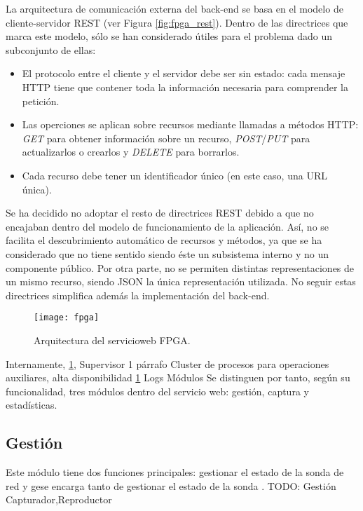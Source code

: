 La arquitectura de comunicación externa del \gls{back-end} se basa en el modelo de cliente-servidor \gls{REST} (ver Figura \ref{fig:fpga_rest}). Dentro de las directrices que marca este modelo, sólo se han considerado útiles para el problema dado un subconjunto de ellas:
\begin{itemize}
  \item El protocolo entre el cliente y el servidor debe ser sin estado: cada mensaje \gls{HTTP} tiene que contener toda la información necesaria para comprender la petición.
  \item Las operciones se aplican sobre recursos mediante llamadas a métodos \gls{HTTP}: \textit{GET} para obtener información sobre un recurso, \textit{POST}/\textit{PUT} para actualizarlos o crearlos y \textit{DELETE} para borrarlos.
  \item Cada recurso debe tener un identificador único (en este caso, una \gls{URL} única).
\end{itemize}

Se ha decidido no adoptar el resto de directrices \gls{REST} debido a que no encajaban dentro del modelo de funcionamiento de la aplicación.
Así, no se facilita el descubrimiento automático de recursos y métodos, ya que se ha considerado que no tiene sentido siendo éste un subsistema interno y no un componente público.
Por otra parte, no se permiten distintas representaciones de un mismo recurso, siendo \gls{JSON} la única representación utilizada.
No seguir estas directrices simplifica además la implementación del \gls{back-end}.

\begin{figure}[!htp]
  \centering
  \texttt{[image: fpga]}
  \caption{Arquitectura del \gls{servicioweb} \gls{FPGA}.}
  \label{fig:arquitectura_servicio}
\end{figure}

Internamente, \ref{fig:arquitectura_servicio}, 
Supervisor
1 párrafo Cluster de procesos para operaciones auxiliares, alta disponibilidad \ref{fig:arquitectura_servicio}
Logs
Módulos
Se distinguen por tanto, según su funcionalidad, tres módulos dentro del servicio web: gestión, captura y estadísticas.
\subsection{Gestión\label{ssec:dis:gestion}}

Este módulo tiene dos funciones principales: gestionar el estado de la sonda de red y gese encarga tanto de gestionar el estado de la sonda .
TODO: Gestión
  {Capturador,Reproductor}


